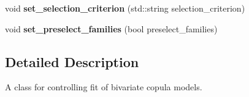 \begin{DoxyCompactItemize}
\item 
\hypertarget{classvinecopulib_1_1_fit_controls_bicop_a52c187e5fcf047825ced777d73483df1}{void {\bfseries set\+\_\+selection\+\_\+criterion} (std\+::string selection\+\_\+criterion)}\label{classvinecopulib_1_1_fit_controls_bicop_a52c187e5fcf047825ced777d73483df1}

\item 
\hypertarget{classvinecopulib_1_1_fit_controls_bicop_a7850b5ba8acaf78109d00789d93cc876}{void {\bfseries set\+\_\+preselect\+\_\+families} (bool preselect\+\_\+families)}\label{classvinecopulib_1_1_fit_controls_bicop_a7850b5ba8acaf78109d00789d93cc876}

\end{DoxyCompactItemize}



\subsection{Detailed Description}
A class for controlling fit of bivariate copula models. 

